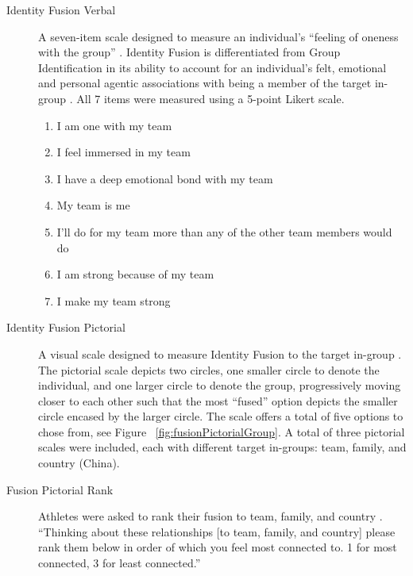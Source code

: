 \begin{description}
  \item [Identity Fusion Verbal] A seven-item scale designed to measure an individual's ``feeling of oneness with the group'' \citep{Swann2009}.  Identity Fusion is differentiated from Group Identification in its ability to account for an individual's felt, emotional and personal agentic associations with being a member of the target in-group \citep{Swann2012a}.  All 7 items were measured using a 5-point Likert scale.
    \begin{enumerate}
      \item I am one with my team
      \item I feel immersed in my team
      \item I have a deep emotional bond with my team
      \item My team is me
      \item I’ll do for my team more than any of the other team members would do
      \item I am strong because of my team
      \item I make my team strong
    \end{enumerate}
  \item [Identity Fusion Pictorial] A visual scale designed to measure Identity Fusion to the target in-group \citep{Swann2009}. The pictorial scale depicts two circles, one smaller circle to denote the individual, and one larger circle to denote the group, progressively moving closer to each other such that the most ``fused'' option depicts the smaller circle encased by the larger circle. The scale offers a total of five options to chose from, see Figure ~\ref{fig:fusionPictorialGroup}.  A total of three pictorial scales were included, each with different target in-groups: team, family, and country (China).
  \item [Fusion Pictorial Rank] Athletes were asked to rank their fusion to team, family, and country \citep{Whitehouse2014}.  ``Thinking about these relationships [to team, family, and country] please rank them below in order of which you feel most connected to. 1 for most connected, 3 for least connected.''
  \end{description}



